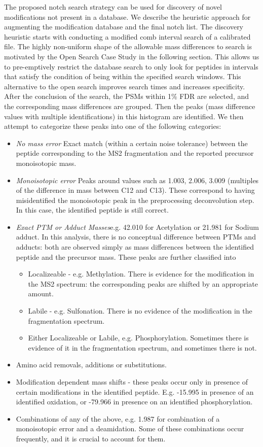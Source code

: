 \documentclass[journal=jprobs,manuscript=article]{achemso}
\begin{document}
The proposed notch search strategy can be used for discovery of novel modifications not present in a database. We describe the heuristic approach for augmenting the modification database and the final notch list. 
The discovery heuristic starts with conducting a modified comb interval search of a calibrated file. The highly non-uniform shape of the allowable mass differences to search is motivated by the Open Search Case Study in the following section. This allows us to pre-emptively restrict the database search to only look for peptides in intervals that satisfy the condition of being within the specified search windows. This alternative to the open search improves search times and increases specificity.
After the conclusion of the search, the PSMs within 1\% FDR are selected, and the corresponding mass differences are grouped. Then the peaks (mass difference values with multiple identifications) in this histogram are identified. We then attempt to categorize these peaks into one of the following categories:
\begin{itemize}
\item \textit{No mass error} Exact match (within a certain noise tolerance) between the peptide corresponding to the MS2 fragmentation and the reported precursor monoisotopic mass.
\item \textit{Monoisotopic error} Peaks around values such as 1.003, 2.006, 3.009 (multiples of the difference in mass between C12 and C13). These correspond to having misidentified the monoisotopic peak in the preprocessing deconvolution step. In this case, the identified peptide is still correct. 
\item \textit{Exact PTM or Adduct Masses}e.g. 42.010 for Acetylation or 21.981 for Sodium adduct. In this analysis, there is no conceptual difference between PTMs and adducts: both are observed simply as mass differences between the identified peptide and the precursor mass.  These peaks are further classified into
\begin{itemize}
\item Localizeable - e.g. Methylation. There is evidence for the modification in the MS2 spectrum: the corresponding peaks are shifted by an appropriate amount. 
\item Labile - e.g. Sulfonation. There is no evidence of the modification in the fragmentation spectrum. 
\item Either Localizeable or Labile, e.g. Phosphorylation. Sometimes there is evidence of it in the fragmentation spectrum, and sometimes there is not. 
\end{itemize}
\item Amino acid removals, additions or substitutions.
\item Modification dependent mass shifts - these peaks occur only in presence of certain modifications in the identified peptide. 	E.g. -15.995 in presence of an identified oxidation, or -79.966 in presence on an identified phosphorylation. 
\item Combinations of any of the above, e.g. 1.987 for combination of a monoisotopic error and a deamidation. Some of these combinations occur frequently, and it is crucial to account for them. 
\end{itemize}
\end{document}
